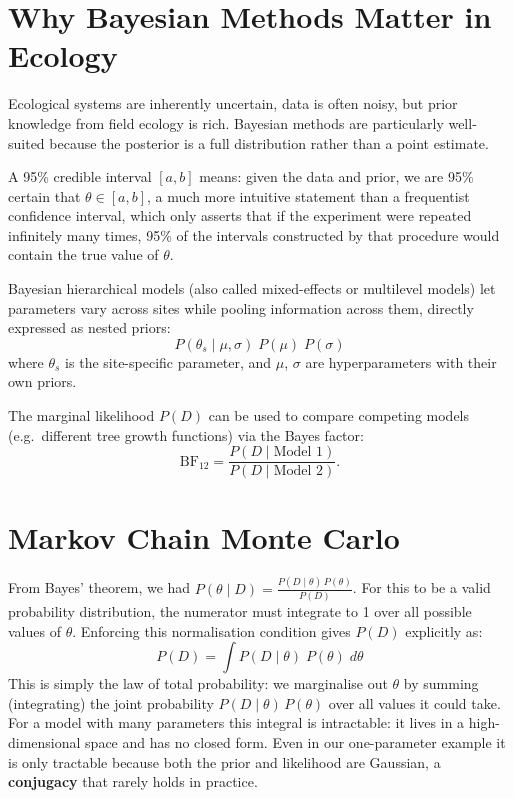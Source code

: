 \documentclass[12pt, a4paper]{article}
\begin{document}
\section{Why Bayesian Methods Matter in Ecology}

Ecological systems are inherently uncertain, data is often
noisy, but prior knowledge from field ecology is rich. Bayesian methods
are particularly well-suited because the posterior is a full distribution 
rather than a point estimate.

A 95\% credible interval $[a, b]$ means: given the data and prior,
we are 95\% certain that $\theta \in [a, b]$, a much more
intuitive statement than a frequentist confidence interval, which
only asserts that if the experiment were repeated infinitely many
times, 95\% of the intervals constructed by that procedure would
contain the true value of $\theta$.

Bayesian hierarchical
models (also called mixed-effects or multilevel models) let
parameters vary across sites while pooling information across
them, directly expressed as nested priors:
\[
P(\theta_s \mid \mu, \sigma) \; P(\mu) \; P(\sigma)
\]
where $\theta_s$ is the site-specific parameter, and $\mu$,
$\sigma$ are hyperparameters with their own priors.

The marginal
likelihood $P(D)$ can be used to compare competing models
(e.g.\ different tree growth functions) via the Bayes factor:
\[
    \text{BF}_{12} = \frac{P(D \mid \text{Model 1})}
                        {P(D \mid \text{Model 2})}.
\]

\section{Markov Chain Monte Carlo}

From Bayes' theorem, we had $P(\theta \mid D) = \frac{P(D \mid \theta)\,P(\theta)}{P(D)}$.
For this to be a valid probability distribution, the numerator must
integrate to 1 over all possible values of $\theta$. Enforcing this
normalisation condition gives $P(D)$ explicitly as:
\[
    P(D) = \int P(D \mid \theta) \; P(\theta) \; d\theta
\]
This is simply the law of total probability: we marginalise out
$\theta$ by summing (integrating) the joint probability
$P(D \mid \theta)\,P(\theta)$ over all values it
could take. For a model with many parameters this integral is
intractable: it lives in a high-dimensional space and has no closed
form. Even in our one-parameter example it is only tractable 
because both the prior and likelihood are Gaussian, a
\textbf{conjugacy} that rarely holds in practice.
\end{document}

